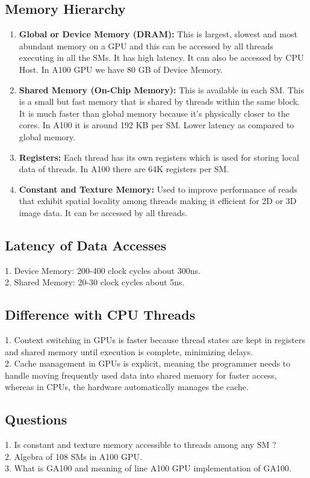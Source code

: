 \subsection*{Memory Hierarchy}
\begin{enumerate}
    \item \textbf{Global or Device Memory (DRAM): }This is largest, slowest and most abundant memory on a GPU and this can be accessed by all threads executing in all the SMs. It has high latency. It can also be accessed by CPU Host. In A100 GPU we have 80 GB of Device Memory.
    \item \textbf{Shared Memory (On-Chip Memory): }This is available in each SM. This is a small but fast memory that is shared by threads within the same block. It is much faster than global memory because it's physically closer to the cores. In A100 it is around 192 KB per SM. Lower latency as compared to global memory.
    \item \textbf{Registers: } Each thread has its own registers which is used for storing local data of threads. In A100 there are 64K registers per SM.
    \item \textbf{Constant and Texture Memory: } Used to improve performance of reads that exhibit spatial locality among threads making it efficient for 2D or 3D image data. It can be accessed by all threads.
\end{enumerate}

\subsection*{Latency of Data Accesses}
1. Device Memory: 200-400 clock cycles about 300ns. \\
2. Shared Memory: 20-30 clock cycles about 5ns. \\

\subsection*{Difference with CPU Threads}
1. Context switching in GPUs is faster because thread states are kept in registers and shared memory until execution is complete, minimizing delays. \\
2. Cache management in GPUs is explicit, meaning the programmer needs to handle moving frequently used data into shared memory for faster access, whereas in CPUs, the hardware automatically manages the cache.

\subsection*{Questions}
1. Is constant and texture memory accessible to threads among any SM ? \\
2. Algebra of 108 SMs in A100 GPU. \\
3. What is GA100 and meaning of line A100 GPU implementation of GA100. \\

